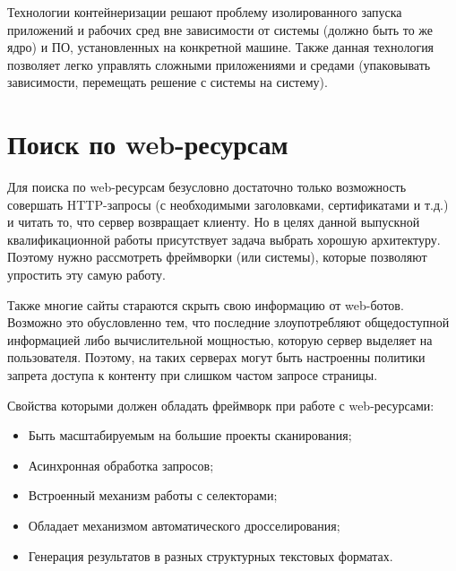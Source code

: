 Технологии контейнеризации решают проблему изолированного запуска приложений и
рабочих сред вне зависимости от системы (должно быть то же ядро) и ПО,
установленных на конкретной машине. Также данная технология позволяет легко
управлять сложными приложениями и средами (упаковывать зависимости, перемещать
решение с системы на систему). 

\section{Поиск по web-ресурсам}
Для поиска по web-ресурсам безусловно достаточно только возможность совершать
HTTP-запросы (с необходимыми заголовками, сертификатами и т.д.) и читать то, что
сервер возвращает клиенту. Но в целях данной выпускной квалификационной работы
присутствует задача выбрать хорошую архитектуру. Поэтому нужно рассмотреть
фреймворки (или системы), которые позволяют упростить эту самую работу.

Также многие сайты стараются скрыть свою информацию от web-ботов. Возможно это
обусловленно тем, что последние злоупотребляют общедоступной информацией либо
вычислительной мощностью, которую сервер выделяет на пользователя. Поэтому, на
таких серверах могут быть настроенны политики запрета доступа к контенту при
слишком частом запросе страницы.

Свойства которыми должен обладать фреймворк при работе с web-ресурсами:
\begin{itemize}
    \item Быть масштабируемым на большие проекты сканирования;
    \item Асинхронная обработка запросов;
    \item Встроенный механизм работы с селекторами;
    \item Обладает механизмом автоматического дросселирования;
    \item Генерация результатов в разных структурных текстовых форматах.
\end{itemize}


